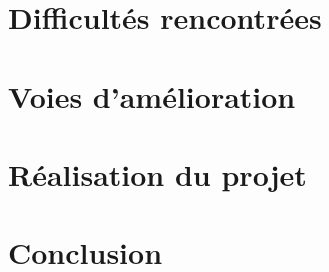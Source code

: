 \section{Difficultés rencontrées}


\section{Voies d'amélioration}


\section{Réalisation du projet}


\section{Conclusion}


